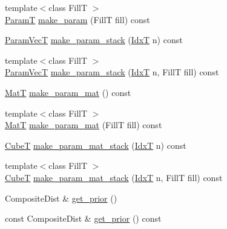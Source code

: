 \begin{DoxyCompactItemize}
\item 
{\footnotesize template$<$class FillT $>$ }\\\hyperlink{classmappel_1_1PointEmitterModel_a665ec6aea3aac139bb69a23c06d4b9a1}{ParamT} \hyperlink{classmappel_1_1PointEmitterModel_a5638e3df26cf84d7cf0f23112132682e}{make\+\_\+param} (FillT fill) const 
\item 
\hyperlink{classmappel_1_1PointEmitterModel_add253b568d763f1513a810aac35de719}{Param\+VecT} \hyperlink{classmappel_1_1PointEmitterModel_a6c7edc7f2549058df66472cd7647cf9b}{make\+\_\+param\+\_\+stack} (\hyperlink{namespacemappel_ab17ec0f30b61ece292439d7ece81d3a8}{IdxT} n) const 
\item 
{\footnotesize template$<$class FillT $>$ }\\\hyperlink{classmappel_1_1PointEmitterModel_add253b568d763f1513a810aac35de719}{Param\+VecT} \hyperlink{classmappel_1_1PointEmitterModel_abab975b04e09e6336a930b6d8fd8c267}{make\+\_\+param\+\_\+stack} (\hyperlink{namespacemappel_ab17ec0f30b61ece292439d7ece81d3a8}{IdxT} n, FillT fill) const 
\item 
\hyperlink{namespacemappel_a7091ab87c528041f7e2027195fad8915}{MatT} \hyperlink{classmappel_1_1PointEmitterModel_a8ede9fe8e3b6a3e621c2da72e23c7f9d}{make\+\_\+param\+\_\+mat} () const 
\item 
{\footnotesize template$<$class FillT $>$ }\\\hyperlink{namespacemappel_a7091ab87c528041f7e2027195fad8915}{MatT} \hyperlink{classmappel_1_1PointEmitterModel_a68a9c537f2f2725eb8fb9d3e250dd84b}{make\+\_\+param\+\_\+mat} (FillT fill) const 
\item 
\hyperlink{namespacemappel_ab2afab4e6c8805e83946670d882768c2}{CubeT} \hyperlink{classmappel_1_1PointEmitterModel_a57b98d5f8b2b5ed2c455bbf76b632f87}{make\+\_\+param\+\_\+mat\+\_\+stack} (\hyperlink{namespacemappel_ab17ec0f30b61ece292439d7ece81d3a8}{IdxT} n) const 
\item 
{\footnotesize template$<$class FillT $>$ }\\\hyperlink{namespacemappel_ab2afab4e6c8805e83946670d882768c2}{CubeT} \hyperlink{classmappel_1_1PointEmitterModel_a2c11fa045187c7ea9ba382141b5d53c1}{make\+\_\+param\+\_\+mat\+\_\+stack} (\hyperlink{namespacemappel_ab17ec0f30b61ece292439d7ece81d3a8}{IdxT} n, FillT fill) const 
\item 
Composite\+Dist \& \hyperlink{classmappel_1_1PointEmitterModel_a2182c250c15d590b582e76594e5f06b9}{get\+\_\+prior} ()
\item 
const Composite\+Dist \& \hyperlink{classmappel_1_1PointEmitterModel_a239826b8e6b914c0cdaa293f1f5ddfd4}{get\+\_\+prior} () const 

\end{DoxyCompactItemize}
